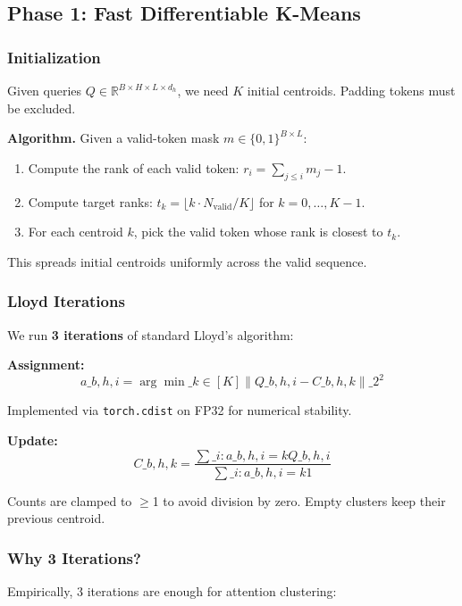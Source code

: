 \subsection{Phase 1: Fast Differentiable K-Means}

\subsubsection{Initialization}

Given queries $Q \in \mathbb{R}^{B \times H \times L \times d_h}$, we need 
$K$ initial centroids. Padding tokens must be excluded.

\textbf{Algorithm.} Given a valid-token mask $m \in \{0, 1\}^{B \times L}$:

\begin{enumerate}
\item Compute the rank of each valid token: $r_i = \sum_{j \leq i} m_j - 1$.
\item Compute target ranks: $t_k = \lfloor k \cdot N_\text{valid} / K \rfloor$
  for $k = 0, \dots, K-1$.
\item For each centroid $k$, pick the valid token whose rank is closest to $t_k$.

\end{enumerate}
This spreads initial centroids uniformly across the valid sequence.

\subsubsection{Lloyd Iterations}

We run \textbf{3 iterations} of standard Lloyd's algorithm:

\textbf{Assignment:}
\[
a\_{b,h,i} = \arg\min\_{k \in [K]} \|Q\_{b,h,i} - C\_{b,h,k}\|\_2^2
\]

Implemented via \texttt{torch.cdist} on FP32 for numerical stability.

\textbf{Update:}
\[
C\_{b,h,k} = \frac{\sum\_{i: a\_{b,h,i} = k} Q\_{b,h,i}}{\sum\_{i: a\_{b,h,i} = k} 1}
\]

Counts are clamped to $\ge$1 to avoid division by zero. Empty clusters keep 
their previous centroid.

\subsubsection{Why 3 Iterations?}

Empirically, 3 iterations are enough for attention clustering:

